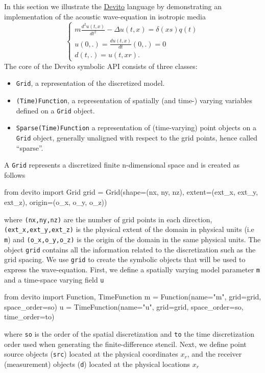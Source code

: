 \documentclass[10pt, conference]{IEEEtran}
\newcommand{\devito}{\href{https://github.com/devitocodes/devito}{Devito} }
\begin{document}
In this section we illustrate the \devito language by demonstrating
an implementation of the acoustic wave-equation in isotropic media
%
\begin{equation}
\begin{cases}
 m \frac{d^2 u(t, x)}{dt^2} - \Delta u(t, x) = \delta(xs) q(t) \\
 u(0, .) = \frac{d u(t, x)}{dt}(0, .) = 0 \\
 d(t, .) = u(t, xr).
 \end{cases}
\label{acou}
\end{equation}
%
 The core of the Devito
symbolic API consists of three classes:

\begin{itemize}
\itemsep1pt\parskip0pt
\item
  \texttt{Grid}, a representation of the discretized model.
\item
  \texttt{(Time)Function}, a representation of spatially (and time-)
  varying variables defined on a \texttt{Grid} object.
\item
  \texttt{Sparse(Time)Function} a representation of (time-varying) point
  objects on a \texttt{Grid} object, generally unaligned with respect to
  the grid points, hence called ``sparse''.
\end{itemize}

A \texttt{Grid} represents a discretized finite n-dimensional space and
is created as follows

\begin{python}[label=grid, caption=Grid creation]
from devito import Grid
grid = Grid(shape=(nx, ny, nz),
            extent=(ext_x, ext_y, ext_z),
            origin=(o_x, o_y, o_z))
\end{python}
\noindent
where \texttt{(nx,\phantom{\ }ny,\phantom{\ }nz)} are the number of grid
points in each direction,
\texttt{(ext\_x,\phantom{\ }ext\_y,\phantom{\ }ext\_z)} is the physical
extent of the domain in physical units (i.e \texttt{m}) and
\texttt{(o\_x,\phantom{\ }o\_y,\phantom{\ }o\_z)} is the origin of the
domain in the same physical units. The object \texttt{grid} contains all
the information related to the discretization such as the grid spacing.
We use \texttt{grid} to create the symbolic objects that will be used to
express the wave-equation. First, we define a spatially varying model
parameter \texttt{m} and a time-space varying field \texttt{u}

\begin{python}[label=function, caption=Function definition]
from devito import Function, TimeFunction
m = Function(name="m", grid=grid,
             space_order=so)
u = TimeFunction(name="u", grid=grid,
                 space_order=so,
                 time_order=to)
\end{python}
\noindent
where \texttt{so} is the order of the spatial discretization and \texttt{to}
the time discretization order used when generating the
finite-difference stencil. Next, we define point source objects (\texttt{src}) located at the physical
coordinates $x_r$, and the receiver (measurement) objects (\texttt{d})
located at the physical locations $x_r$
\end{document}
